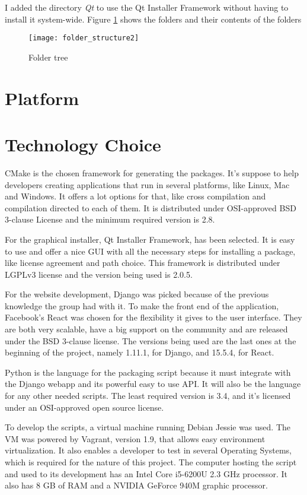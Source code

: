 I added the directory \textit{Qt} to use the Qt Installer Framework without having to install it system-wide. Figure \ref{fig:folder_structure} shows the folders and their contents of the folders

\begin{figure}[h!]
\centering
\texttt{[image: folder\_structure2]}
\caption{Folder tree}
\label{fig:folder_structure}
\end{figure}

\section[Platform]{Platform}


\section[Technology Choice]{Technology Choice}

CMake is the chosen framework for generating the packages. It's suppose to help developers creating applications that run in several platforms, like Linux, Mac and Windows. It offers a lot options for that, like cross compilation and compilation directed to each of them. It is distributed under OSI-approved BSD 3-clause License and the minimum required version is 2.8.

For the graphical installer, Qt Installer Framework, has been selected. It is easy to use and offer a nice GUI with all the necessary steps for installing a package, like license agreement and path choice. This framework is distributed under LGPLv3 license and the version being used is 2.0.5.

For the website development, Django was picked because of the previous knowledge the group had with it. To make the front end of the application, Facebook's React was chosen for the flexibility it gives to the user interface. They are both very scalable, have a big support on the community and are released under the BSD 3-clause license. The versions being used are the last ones at the beginning of the project, namely 1.11.1, for Django, and 15.5.4, for React.

Python is the language for the packaging script because it must integrate with the Django webapp and its powerful easy to use API. It will also be the language for any other needed scripts. The least required version is 3.4, and it's licensed under an OSI-approved open source license.

To develop the scripts, a virtual machine running Debian Jessie was used. The VM was powered by Vagrant, version 1.9, that allows easy environment virtualization. It also enables a developer to test in several Operating Systems, which is required for the nature of this project. The computer hosting the script and used to its development has an Intel Core i5-6200U 2.3 GHz processor. It also has 8 GB of RAM and a NVIDIA GeForce 940M graphic processor.
